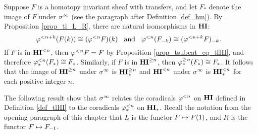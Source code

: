 \begin{ex}\label{ex_TFHI_eq_TFHM}
Suppose $F$ is a homotopy invariant sheaf with transfers, and
let $F_*$ denote the image of $F$ under $\spectHI$ (see the paragraph after
Definition \ref{def_hm}). By Proposition \ref{prop_tl_L_R}, there are natural isomorphisms 
in $\HI$:
\[
\tlHI{n + k}(\LHI[k]{F}) \cong \LHI[k]{(\tlHI{n}F)} \;\;\textrm{ and }\;\; 
\tlHI{n}(\RHI[k]{F}) \cong \RHI[k]{(\tlHI{n + k}F)}.
\]
If $F$ is in $\TFHI{n}$, then $\tlHI{n}F 
= F$ by Proposition \ref{prop_tsubcat_eq_tlHI}, and therefore
$\tlHM{n}(F_*) \cong F_*$. Similarly, if $F$ is in $\THI{n}$,
then $\tgHM{n}(F_*) \cong F_*$. It follows that the image of
$\THI{n}$ under $\spectHI$ is $\THM{n}$ and $\TFHI{n}$ under
$\spectHI$ is $\TFHM{n}$ for each positive integer $n$.
\end{ex}

The following result show that $\spectHI$ relates the coradicals $\tlHI{n}$ on $\HI$ 
defined in Definition \ref{def_tlHI} to the coradicals $\tlHM{n}$ 
on $\HM$. Recall the notation from the opening paragraph of this
chapter that $L$ is the functor $F \mapsto \LHI{F}$, and $R$ is
the functor $F \mapsto \RHI{F}$.

